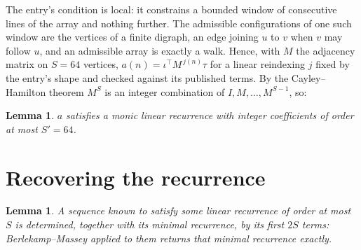 \documentclass[11pt,a4paper]{article}
\theoremstyle{plain}
\newtheorem{lemma}[theorem]{Lemma}
\theoremstyle{definition}
\begin{document}
The entry's condition is local: it constrains a bounded window of consecutive lines of the
array and nothing further. The admissible configurations of one such window are the vertices
of a finite digraph, an edge joining $u$ to $v$ when $v$ may follow $u$, and an admissible
array is exactly a walk. Hence, with $M$ the adjacency matrix on $S=64$ vertices,
$a(n)=\iota^{\!\top}M^{\,j(n)}\tau$ for a linear reindexing $j$ fixed by the entry's shape
and checked against its published terms. By the Cayley--Hamilton theorem $M^{S}$ is an
integer combination of $I,M,\dots,M^{S-1}$, so:

\begin{lemma}\label{lem:cf}
$a$ satisfies a monic linear recurrence with integer coefficients of order at most
$S'=64$.
\end{lemma}

\section{Recovering the recurrence}

\begin{lemma}\label{lem:bm}
A sequence known to satisfy some linear recurrence of order at most $S$ is determined, together
with its minimal recurrence, by its first $2S$ terms: Berlekamp--Massey applied to them returns
that minimal recurrence exactly.
\end{lemma}
\end{document}
